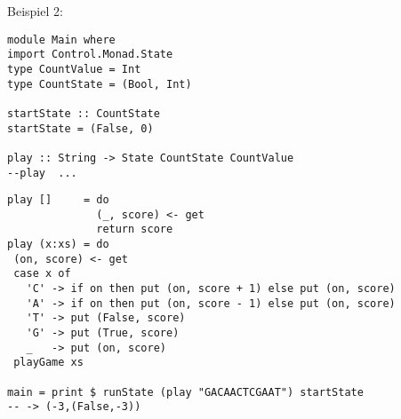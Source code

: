 \documentclass{beamer}
\begin{document}
\begin{frame}[fragile]
Beispiel 2:
\begin{verbatim}
module Main where
import Control.Monad.State
type CountValue = Int
type CountState = (Bool, Int)
 
startState :: CountState
startState = (False, 0)

play :: String -> State CountState CountValue
--play  ...

\end{verbatim}
\end{frame}

\begin{frame}[fragile]
\begin{verbatim}
play []     = do
              (_, score) <- get
              return score
play (x:xs) = do
 (on, score) <- get
 case x of
   'C' -> if on then put (on, score + 1) else put (on, score)
   'A' -> if on then put (on, score - 1) else put (on, score)
   'T' -> put (False, score)
   'G' -> put (True, score)
   _   -> put (on, score)
 playGame xs

main = print $ runState (play "GACAACTCGAAT") startState
-- -> (-3,(False,-3))
\end{verbatim}
\end{frame}
\end{document}
